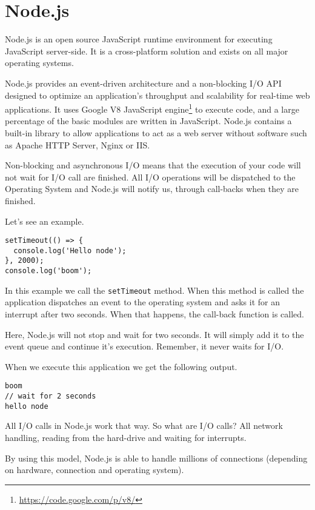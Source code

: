 \section{Node.js}\label{sec:nodejs}
Node.js is an open source JavaScript runtime environment for executing JavaScript server-side. It is a cross-platform solution and exists on all major operating systems.

Node.js provides an event-driven architecture and a non-blocking I/O API designed to optimize an application's throughput and scalability for real-time web applications. It uses Google V8 JavaScript engine\footnote{\url{https://code.google.com/p/v8/}} to execute code, and a large percentage of the basic modules are written in JavaScript. Node.js contains a built-in library to allow applications to act as a web server without software such as Apache HTTP Server, Nginx or IIS.

Non-blocking and asynchronous I/O means that the execution of your code will not wait for I/O call are finished. All I/O operations will be dispatched to the Operating System and Node.js will notify us, through call-backs when they are finished.

Let's see an example.

\begin{lstlisting}
setTimeout(() => {
  console.log('Hello node');
}, 2000);
console.log('boom');
\end{lstlisting}

In this example we call the \texttt{setTimeout} method. When this method is called the application dispatches an event to the operating system and asks it for an interrupt after two seconds. When that happens, the call-back function is called.

Here, Node.js will not stop and wait for two seconds. It will simply add it to the event queue and continue it's execution. Remember, it never waits for I/O.

When we execute this application we get the following output.
\begin{lstlisting}
boom
// wait for 2 seconds
hello node
\end{lstlisting}

All I/O calls in Node.js work that way. So what are I/O calls? All network handling, reading from the hard-drive and waiting for interrupts.

By using this model, Node.js is able to handle millions of connections (depending on hardware, connection and operating system).

